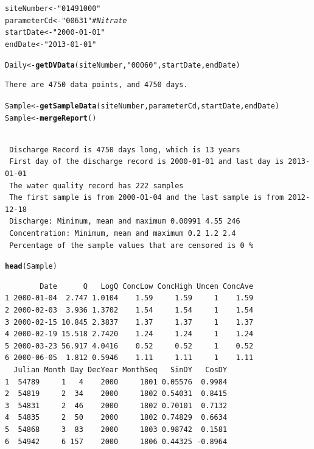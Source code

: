 \documentclass[a4paper,11pt]{article}\usepackage[]{graphicx}\usepackage[]{color}
\makeatletter
\newcommand{\hlstr}[1]{\textcolor[rgb]{0.192,0.494,0.8}{#1}}%
\newcommand{\hlcom}[1]{\textcolor[rgb]{0.678,0.584,0.686}{\textit{#1}}}%
\newcommand{\hlstd}[1]{\textcolor[rgb]{0.345,0.345,0.345}{#1}}%
\newcommand{\hlkwb}[1]{\textcolor[rgb]{0.69,0.353,0.396}{#1}}%
\newcommand{\hlkwd}[1]{\textcolor[rgb]{0.737,0.353,0.396}{\textbf{#1}}}%
\newenvironment{kframe}{%
 \def\at@end@of@kframe{}%
 \ifinner\ifhmode%
  \def\at@end@of@kframe{\end{minipage}}%
  \begin{minipage}{\columnwidth}%
 \fi\fi%
 \def\FrameCommand##1{\hskip\@totalleftmargin \hskip-\fboxsep
 \colorbox{shadecolor}{##1}\hskip-\fboxsep
     \hskip-\linewidth \hskip-\@totalleftmargin \hskip\columnwidth}%
 \MakeFramed {\advance\hsize-\width
   \@totalleftmargin\z@ \linewidth\hsize
   \@setminipage}}%
 {\par\unskip\endMakeFramed%
 \at@end@of@kframe}
\newenvironment{knitrout}{}{} %
\makeatother
\begin{document}
\begin{knitrout}
\color{fgcolor}\begin{kframe}
\begin{alltt}
\hlstd{siteNumber} \hlkwb{<-} \hlstr{"01491000"}
\hlstd{parameterCd} \hlkwb{<-} \hlstr{"00631"}  \hlcom{# Nitrate}
\hlstd{startDate} \hlkwb{<-} \hlstr{"2000-01-01"}
\hlstd{endDate} \hlkwb{<-} \hlstr{"2013-01-01"}

\hlstd{Daily} \hlkwb{<-} \hlkwd{getDVData}\hlstd{(siteNumber,} \hlstr{"00060"}\hlstd{, startDate, endDate)}
\end{alltt}
\begin{verbatim}
There are 4750 data points, and 4750 days.
\end{verbatim}
\begin{alltt}
\hlstd{Sample} \hlkwb{<-} \hlkwd{getSampleData}\hlstd{(siteNumber,parameterCd, startDate, endDate)}
\hlstd{Sample} \hlkwb{<-} \hlkwd{mergeReport}\hlstd{()}
\end{alltt}
\begin{verbatim}

 Discharge Record is 4750 days long, which is 13 years
 First day of the discharge record is 2000-01-01 and last day is 2013-01-01
 The water quality record has 222 samples
 The first sample is from 2000-01-04 and the last sample is from 2012-12-18
 Discharge: Minimum, mean and maximum 0.00991 4.55 246
 Concentration: Minimum, mean and maximum 0.2 1.2 2.4
 Percentage of the sample values that are censored is 0 %
\end{verbatim}
\begin{alltt}
\hlkwd{head}\hlstd{(Sample)}
\end{alltt}
\begin{verbatim}
        Date      Q   LogQ ConcLow ConcHigh Uncen ConcAve
1 2000-01-04  2.747 1.0104    1.59     1.59     1    1.59
2 2000-02-03  3.936 1.3702    1.54     1.54     1    1.54
3 2000-02-15 10.845 2.3837    1.37     1.37     1    1.37
4 2000-02-19 15.518 2.7420    1.24     1.24     1    1.24
5 2000-03-23 56.917 4.0416    0.52     0.52     1    0.52
6 2000-06-05  1.812 0.5946    1.11     1.11     1    1.11
  Julian Month Day DecYear MonthSeq   SinDY   CosDY
1  54789     1   4    2000     1801 0.05576  0.9984
2  54819     2  34    2000     1802 0.54031  0.8415
3  54831     2  46    2000     1802 0.70101  0.7132
4  54835     2  50    2000     1802 0.74829  0.6634
5  54868     3  83    2000     1803 0.98742  0.1581
6  54942     6 157    2000     1806 0.44325 -0.8964
\end{verbatim}
\end{kframe}
\end{knitrout}
\end{document}
